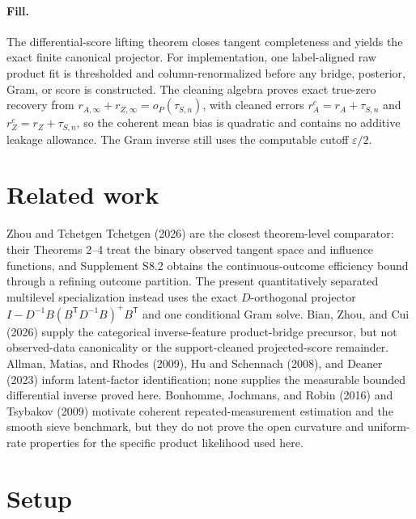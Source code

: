 \documentclass{article}
\begin{document}
\paragraph{Fill.} The differential-score lifting theorem closes tangent completeness and yields the exact finite canonical projector.  For implementation, one label-aligned raw product fit is thresholded and column-renormalized before any bridge, posterior, Gram, or score is constructed.  The cleaning algebra proves exact true-zero recovery from \(r_{A,\infty}+r_{Z,\infty}=o_P(\tau_{S,n})\), with cleaned errors \(r_A^c=r_A+\tau_{S,n}\) and \(r_Z^c=r_Z+\tau_{S,n}\), so the coherent mean bias is quadratic and contains no additive leakage allowance.  The Gram inverse still uses the computable cutoff \(\varepsilon/2\).

\section{Related work}

Zhou and Tchetgen Tchetgen (2026) are the closest theorem-level comparator: their Theorems 2--4 treat the binary observed tangent space and influence functions, and Supplement S8.2 obtains the continuous-outcome efficiency bound through a refining outcome partition.  The present quantitatively separated multilevel specialization instead uses the exact \(D\)-orthogonal projector \(I-D^{-1}B(B^{\mathsf T}D^{-1}B)^+B^{\mathsf T}\) and one conditional Gram solve.  Bian, Zhou, and Cui (2026) supply the categorical inverse-feature product-bridge precursor, but not observed-data canonicality or the support-cleaned projected-score remainder.  Allman, Matias, and Rhodes (2009), Hu and Schennach (2008), and Deaner (2023) inform latent-factor identification; none supplies the measurable bounded differential inverse proved here.  Bonhomme, Jochmans, and Robin (2016) and Tsybakov (2009) motivate coherent repeated-measurement estimation and the smooth sieve benchmark, but they do not prove the open curvature and uniform-rate properties for the specific product likelihood used here.

\section{Setup}
\end{document}
